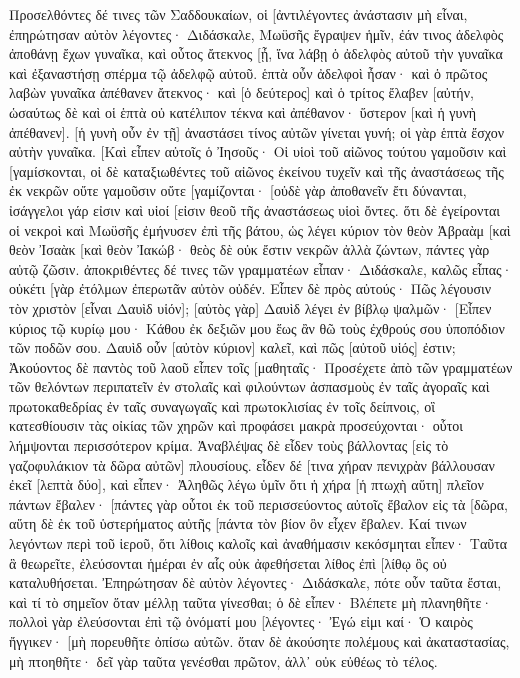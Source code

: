 Προσελθόντες δέ τινες τῶν Σαδδουκαίων, οἱ [ἀντιλέγοντες ἀνάστασιν μὴ εἶναι, ἐπηρώτησαν αὐτὸν 
λέγοντες· Διδάσκαλε, Μωϋσῆς ἔγραψεν ἡμῖν, ἐάν τινος ἀδελφὸς ἀποθάνῃ ἔχων γυναῖκα, καὶ οὗτος ἄτεκνος [ᾖ, ἵνα λάβῃ ὁ ἀδελφὸς αὐτοῦ τὴν γυναῖκα καὶ ἐξαναστήσῃ σπέρμα τῷ ἀδελφῷ αὐτοῦ. 
ἑπτὰ οὖν ἀδελφοὶ ἦσαν· καὶ ὁ πρῶτος λαβὼν γυναῖκα ἀπέθανεν ἄτεκνος· 
καὶ [ὁ δεύτερος] 
καὶ ὁ τρίτος ἔλαβεν [αὐτήν, ὡσαύτως δὲ καὶ οἱ ἑπτὰ οὐ κατέλιπον τέκνα καὶ ἀπέθανον· 
ὕστερον [καὶ ἡ γυνὴ ἀπέθανεν]. 
[ἡ γυνὴ οὖν ἐν τῇ] ἀναστάσει τίνος αὐτῶν γίνεται γυνή; οἱ γὰρ ἑπτὰ ἔσχον αὐτὴν γυναῖκα. 
[Καὶ εἶπεν αὐτοῖς ὁ Ἰησοῦς· Οἱ υἱοὶ τοῦ αἰῶνος τούτου γαμοῦσιν καὶ [γαμίσκονται, 
οἱ δὲ καταξιωθέντες τοῦ αἰῶνος ἐκείνου τυχεῖν καὶ τῆς ἀναστάσεως τῆς ἐκ νεκρῶν οὔτε γαμοῦσιν οὔτε [γαμίζονται· 
[οὐδὲ γὰρ ἀποθανεῖν ἔτι δύνανται, ἰσάγγελοι γάρ εἰσιν καὶ υἱοί [εἰσιν θεοῦ τῆς ἀναστάσεως υἱοὶ ὄντες. 
ὅτι δὲ ἐγείρονται οἱ νεκροὶ καὶ Μωϋσῆς ἐμήνυσεν ἐπὶ τῆς βάτου, ὡς λέγει κύριον τὸν θεὸν Ἀβραὰμ [καὶ θεὸν Ἰσαὰκ [καὶ θεὸν Ἰακώβ· 
θεὸς δὲ οὐκ ἔστιν νεκρῶν ἀλλὰ ζώντων, πάντες γὰρ αὐτῷ ζῶσιν. 
ἀποκριθέντες δέ τινες τῶν γραμματέων εἶπαν· Διδάσκαλε, καλῶς εἶπας· 
οὐκέτι [γὰρ ἐτόλμων ἐπερωτᾶν αὐτὸν οὐδέν. 
Εἶπεν δὲ πρὸς αὐτούς· Πῶς λέγουσιν τὸν χριστὸν [εἶναι Δαυὶδ υἱόν]; 
[αὐτὸς γὰρ] Δαυὶδ λέγει ἐν βίβλῳ ψαλμῶν· [Εἶπεν κύριος τῷ κυρίῳ μου· Κάθου ἐκ δεξιῶν μου 
ἕως ἂν θῶ τοὺς ἐχθρούς σου ὑποπόδιον τῶν ποδῶν σου. 
Δαυὶδ οὖν [αὐτὸν κύριον] καλεῖ, καὶ πῶς [αὐτοῦ υἱός] ἐστιν; 
Ἀκούοντος δὲ παντὸς τοῦ λαοῦ εἶπεν τοῖς [μαθηταῖς· 
Προσέχετε ἀπὸ τῶν γραμματέων τῶν θελόντων περιπατεῖν ἐν στολαῖς καὶ φιλούντων ἀσπασμοὺς ἐν ταῖς ἀγοραῖς καὶ πρωτοκαθεδρίας ἐν ταῖς συναγωγαῖς καὶ πρωτοκλισίας ἐν τοῖς δείπνοις, 
οἳ κατεσθίουσιν τὰς οἰκίας τῶν χηρῶν καὶ προφάσει μακρὰ προσεύχονται· οὗτοι λήμψονται περισσότερον κρίμα. 
Ἀναβλέψας δὲ εἶδεν τοὺς βάλλοντας [εἰς τὸ γαζοφυλάκιον τὰ δῶρα αὐτῶν] πλουσίους. 
εἶδεν δέ [τινα χήραν πενιχρὰν βάλλουσαν ἐκεῖ [λεπτὰ δύο], 
καὶ εἶπεν· Ἀληθῶς λέγω ὑμῖν ὅτι ἡ χήρα [ἡ πτωχὴ αὕτη] πλεῖον πάντων ἔβαλεν· 
[πάντες γὰρ οὗτοι ἐκ τοῦ περισσεύοντος αὐτοῖς ἔβαλον εἰς τὰ [δῶρα, αὕτη δὲ ἐκ τοῦ ὑστερήματος αὐτῆς [πάντα τὸν βίον ὃν εἶχεν ἔβαλεν. 
Καί τινων λεγόντων περὶ τοῦ ἱεροῦ, ὅτι λίθοις καλοῖς καὶ ἀναθήμασιν κεκόσμηται εἶπεν· 
Ταῦτα ἃ θεωρεῖτε, ἐλεύσονται ἡμέραι ἐν αἷς οὐκ ἀφεθήσεται λίθος ἐπὶ [λίθῳ ὃς οὐ καταλυθήσεται. 
Ἐπηρώτησαν δὲ αὐτὸν λέγοντες· Διδάσκαλε, πότε οὖν ταῦτα ἔσται, καὶ τί τὸ σημεῖον ὅταν μέλλῃ ταῦτα γίνεσθαι; 
ὁ δὲ εἶπεν· Βλέπετε μὴ πλανηθῆτε· πολλοὶ γὰρ ἐλεύσονται ἐπὶ τῷ ὀνόματί μου [λέγοντες· Ἐγώ εἰμι καί· Ὁ καιρὸς ἤγγικεν· [μὴ πορευθῆτε ὀπίσω αὐτῶν. 
ὅταν δὲ ἀκούσητε πολέμους καὶ ἀκαταστασίας, μὴ πτοηθῆτε· δεῖ γὰρ ταῦτα γενέσθαι πρῶτον, ἀλλ᾽ οὐκ εὐθέως τὸ τέλος. 

